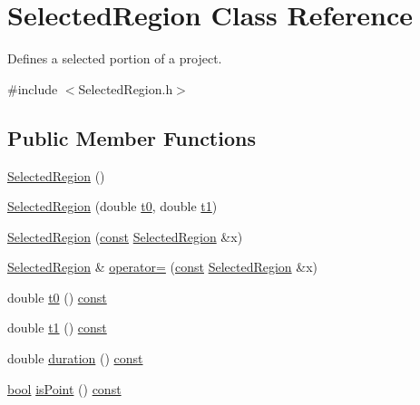 \hypertarget{class_selected_region}{}\section{Selected\+Region Class Reference}
\label{class_selected_region}


Defines a selected portion of a project.  




{\ttfamily \#include $<$Selected\+Region.\+h$>$}

\subsection*{Public Member Functions}
\begin{DoxyCompactItemize}
\item 
\hyperlink{class_selected_region_a837fd24a015341b58ad9e024ec6f41f3}{Selected\+Region} ()
\item 
\hyperlink{class_selected_region_a441df6e86dedaba4778af07bb7ff3183}{Selected\+Region} (double \hyperlink{class_selected_region_a699851ec9e5a209be86f552f0826687d}{t0}, double \hyperlink{class_selected_region_aec8e1688714de8fb218d0cf0188360d6}{t1})
\item 
\hyperlink{class_selected_region_a4806426d25a90aae136097032ea75e49}{Selected\+Region} (\hyperlink{getopt1_8c_a2c212835823e3c54a8ab6d95c652660e}{const} \hyperlink{class_selected_region}{Selected\+Region} \&x)
\item 
\hyperlink{class_selected_region}{Selected\+Region} \& \hyperlink{class_selected_region_a05b20010be7cc1a2c1dabca59c66f200}{operator=} (\hyperlink{getopt1_8c_a2c212835823e3c54a8ab6d95c652660e}{const} \hyperlink{class_selected_region}{Selected\+Region} \&x)
\item 
double \hyperlink{class_selected_region_a699851ec9e5a209be86f552f0826687d}{t0} () \hyperlink{getopt1_8c_a2c212835823e3c54a8ab6d95c652660e}{const} 
\item 
double \hyperlink{class_selected_region_aec8e1688714de8fb218d0cf0188360d6}{t1} () \hyperlink{getopt1_8c_a2c212835823e3c54a8ab6d95c652660e}{const} 
\item 
double \hyperlink{class_selected_region_a855c8beba67ec9b1e1f243a2532d1045}{duration} () \hyperlink{getopt1_8c_a2c212835823e3c54a8ab6d95c652660e}{const} 
\item 
\hyperlink{mac_2config_2i386_2lib-src_2libsoxr_2soxr-config_8h_abb452686968e48b67397da5f97445f5b}{bool} \hyperlink{class_selected_region_ad98c3c19684309127345db2dc9ea7165}{is\+Point} () \hyperlink{getopt1_8c_a2c212835823e3c54a8ab6d95c652660e}{const} 

\end{DoxyCompactItemize}

